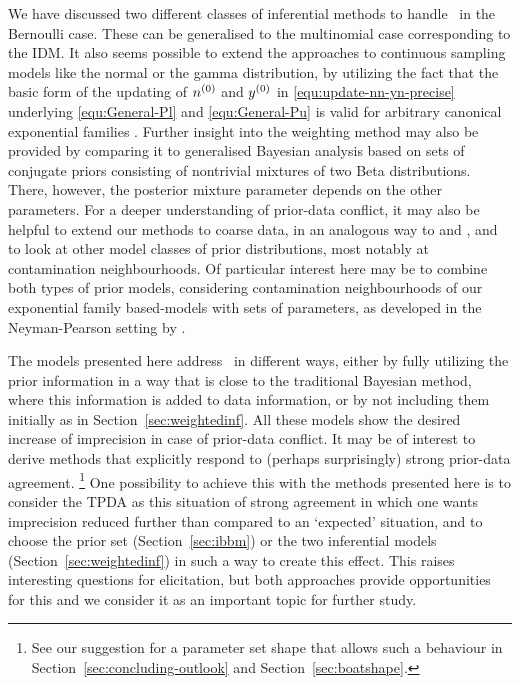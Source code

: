 We have discussed two different classes of inferential
methods to handle \pdc\ in the Bernoulli case. These can be
generalised to the multinomial case corresponding to the IDM.
It also seems possible to extend the approaches to continuous sampling models like the normal
or the gamma distribution, by utilizing the fact that the basic form
of the updating of $n^{(0)}$ and $y^{(0)}$ in
\eqref{equ:update-nn-yn-precise} underlying \eqref{equ:General-Pl}
and \eqref{equ:General-Pu} is valid for arbitrary canonical
exponential families \parencite[see][and Section~\ref{sec:generalmodel}]{2005:quaeghebeurcooman,Walter2009a}.
Further insight into the weighting method may also be provided by
comparing it to generalised Bayesian analysis based on sets of
conjugate priors consisting of nontrivial mixtures of two Beta
distributions. There, however, the posterior mixture parameter depends
on the other parameters.
For a deeper understanding of prior-data conflict, it may also be helpful
to extend our methods to coarse data, in an analogous way to \textcite{2007:utkinaugustin} and
\textcite{2009:Troffaes:Coolen}, and to look at other model classes of prior distributions, most
notably at contamination neighbourhoods. Of particular interest here may
be to combine both types of prior models, considering contamination
neighbourhoods of our exponential family based-models with sets of
parameters, as developed in the Neyman-Pearson setting by
\textcite[\S~5]{2002:augustin}.

The models presented here address \pdc\
in different ways, either by fully utilizing the prior information in a way that is close to the
traditional Bayesian method, where this information is added to data
information, or by not including them initially as in
Section~\ref{sec:weightedinf}. All these models show the desired increase of
imprecision in case of prior-data conflict. It may be of
interest to derive methods that explicitly respond to (perhaps
surprisingly) strong prior-data agreement.%
\footnote{See our suggestion for a parameter set shape that allows
such a behaviour in Section~\ref{sec:concluding-outlook} and Section~\ref{sec:boatshape}.}
One possibility to achieve this with the methods presented here is to
consider the TPDA as this situation of strong agreement in which one wants
imprecision reduced further than compared to an `expected'
situation, and to choose the prior set (Section~\ref{sec:ibbm}) or the two
inferential models (Section~\ref{sec:weightedinf}) in such a way to create this effect.
This raises interesting questions for elicitation, but both approaches
provide opportunities for this and we consider it as an important topic for further
study. %

